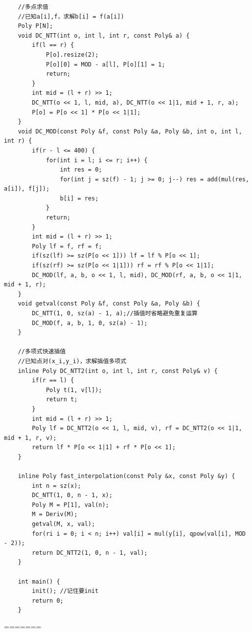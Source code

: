 \documentclass[a4paper,11pt,twoside,fontset = fandol,UTF8]{ctexbook} %
\begin{document}
\begin{lstlisting}
	//多点求值
	//已知a[i],f，求解b[i] = f(a[i])
	Poly P[N];
	void DC_NTT(int o, int l, int r, const Poly& a) {
	    if(l == r) {
	        P[o].resize(2);
	        P[o][0] = MOD - a[l], P[o][1] = 1;
	        return;
	    }
	    int mid = (l + r) >> 1;
	    DC_NTT(o << 1, l, mid, a), DC_NTT(o << 1|1, mid + 1, r, a);
	    P[o] = P[o << 1] * P[o << 1|1];
	}
	void DC_MOD(const Poly &f, const Poly &a, Poly &b, int o, int l, int r) {
	    if(r - l <= 400) {
	        for(int i = l; i <= r; i++) {
	            int res = 0;
	            for(int j = sz(f) - 1; j >= 0; j--) res = add(mul(res, a[i]), f[j]);
	            b[i] = res;
	        }   
	        return;
	    }
	    int mid = (l + r) >> 1;
	    Poly lf = f, rf = f;
	    if(sz(lf) >= sz(P[o << 1])) lf = lf % P[o << 1];
	    if(sz(rf) >= sz(P[o << 1|1])) rf = rf % P[o << 1|1];
	    DC_MOD(lf, a, b, o << 1, l, mid), DC_MOD(rf, a, b, o << 1|1, mid + 1, r);
	}
	void getval(const Poly &f, const Poly &a, Poly &b) {
	    DC_NTT(1, 0, sz(a) - 1, a);//插值时省略避免重复运算
	    DC_MOD(f, a, b, 1, 0, sz(a) - 1);
	}
	 
	//多项式快速插值
	//已知点对(x_i,y_i)，求解插值多项式
	inline Poly DC_NTT2(int o, int l, int r, const Poly& v) {
	    if(r == l) {
	        Poly t(1, v[l]);
	        return t;
	    }
	    int mid = (l + r) >> 1;
	    Poly lf = DC_NTT2(o << 1, l, mid, v), rf = DC_NTT2(o << 1|1, mid + 1, r, v);
	    return lf * P[o << 1|1] + rf * P[o << 1];
	}
	 
	inline Poly fast_interpolation(const Poly &x, const Poly &y) {
	    int n = sz(x);
	    DC_NTT(1, 0, n - 1, x);
	    Poly M = P[1], val(n);
	    M = Deriv(M);
	    getval(M, x, val);
	    for(ri i = 0; i < n; i++) val[i] = mul(y[i], qpow(val[i], MOD - 2));
	    return DC_NTT2(1, 0, n - 1, val);
	}
	 
	int main() {
	    init(); //记住要init
	    return 0;   
	}
	\end{lstlisting}

=======
\end{document}
